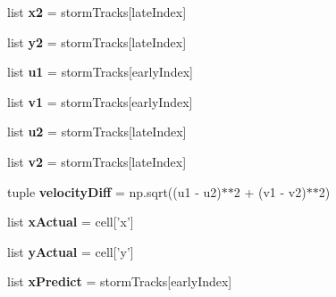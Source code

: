 \begin{DoxyCompactItemize}
\item 
\hypertarget{namespacebest__track_a49cef97475cce24b735fda756b01a0ac}{list {\bfseries x2} = storm\-Tracks\mbox{[}late\-Index\mbox{]}}\label{namespacebest__track_a49cef97475cce24b735fda756b01a0ac}

\item 
\hypertarget{namespacebest__track_ab57e73b79d99e736c4620ca990cf43fe}{list {\bfseries y2} = storm\-Tracks\mbox{[}late\-Index\mbox{]}}\label{namespacebest__track_ab57e73b79d99e736c4620ca990cf43fe}

\item 
\hypertarget{namespacebest__track_a264b2a71f6e24a848376ce78a33b5024}{list {\bfseries u1} = storm\-Tracks\mbox{[}early\-Index\mbox{]}}\label{namespacebest__track_a264b2a71f6e24a848376ce78a33b5024}

\item 
\hypertarget{namespacebest__track_af9bd755aa6af0797bbc6dfd62f5ebdaf}{list {\bfseries v1} = storm\-Tracks\mbox{[}early\-Index\mbox{]}}\label{namespacebest__track_af9bd755aa6af0797bbc6dfd62f5ebdaf}

\item 
\hypertarget{namespacebest__track_a4d281eb899fdec639d67fb09f289a587}{list {\bfseries u2} = storm\-Tracks\mbox{[}late\-Index\mbox{]}}\label{namespacebest__track_a4d281eb899fdec639d67fb09f289a587}

\item 
\hypertarget{namespacebest__track_a3e997e851b3021eb8e52326e1a213dd4}{list {\bfseries v2} = storm\-Tracks\mbox{[}late\-Index\mbox{]}}\label{namespacebest__track_a3e997e851b3021eb8e52326e1a213dd4}

\item 
\hypertarget{namespacebest__track_ab06331683713cbbbea136f21d32874a1}{tuple {\bfseries velocity\-Diff} = np.\-sqrt((u1 -\/ u2)$\ast$$\ast$2 + (v1 -\/ v2)$\ast$$\ast$2)}\label{namespacebest__track_ab06331683713cbbbea136f21d32874a1}

\item 
\hypertarget{namespacebest__track_a04fe51ac0e8c7a98b32bb63ceaef071c}{list {\bfseries x\-Actual} = cell\mbox{[}'x'\mbox{]}}\label{namespacebest__track_a04fe51ac0e8c7a98b32bb63ceaef071c}

\item 
\hypertarget{namespacebest__track_a7408640a136a909bcdaa36b48e9563e3}{list {\bfseries y\-Actual} = cell\mbox{[}'y'\mbox{]}}\label{namespacebest__track_a7408640a136a909bcdaa36b48e9563e3}

\item 
\hypertarget{namespacebest__track_aa631baf16af9c888ccce578f96e1c08e}{list {\bfseries x\-Predict} = storm\-Tracks\mbox{[}early\-Index\mbox{]}}\label{namespacebest__track_aa631baf16af9c888ccce578f96e1c08e}


\end{DoxyCompactItemize}
